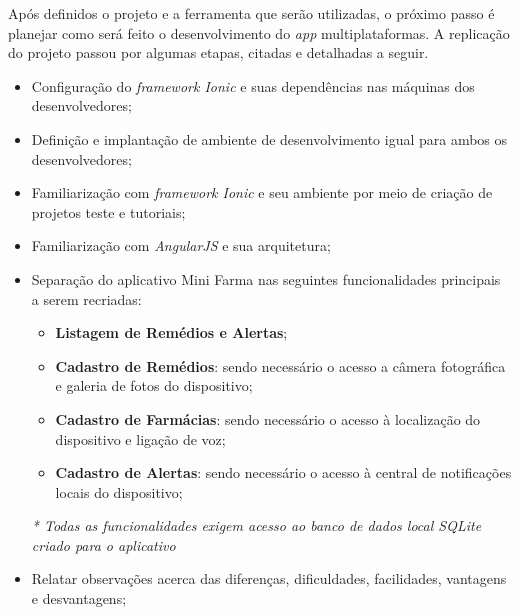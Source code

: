 Após definidos o projeto e a ferramenta que serão utilizadas, o próximo passo é planejar como será feito o desenvolvimento do \textit{app} multiplataformas. 
A replicação do projeto passou por algumas etapas, citadas e detalhadas a seguir.

\begin{itemize}
    \item Configuração do \textit{framework Ionic} e suas dependências nas máquinas dos desenvolvedores;
    \item Definição e implantação de ambiente de desenvolvimento igual para ambos os desenvolvedores;
    \item Familiarização com \textit{framework Ionic} e seu ambiente por meio de criação de projetos teste e tutoriais;
    \item Familiarização com \textit{AngularJS} e sua arquitetura; 
    \item Separação do aplicativo Mini Farma nas seguintes funcionalidades principais a serem recriadas:
        \begin{itemize}
            \item \textbf{Listagem de Remédios e Alertas};
            \item \textbf{Cadastro de Remédios}: sendo necessário o acesso a câmera fotográfica e galeria de fotos do dispositivo;
            \item \textbf{Cadastro de Farmácias}: sendo necessário o acesso à localização do dispositivo e ligação de voz;
            \item \textbf{Cadastro de Alertas}: sendo necessário o acesso à central de notificações locais do dispositivo;
        \end{itemize}
        \textit{* Todas as funcionalidades exigem acesso ao banco de dados local SQLite criado para o aplicativo}
    \item Relatar observações acerca das diferenças, dificuldades, facilidades, vantagens e desvantagens;
\end{itemize}